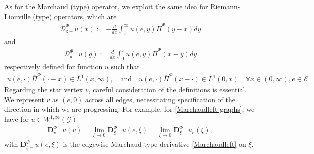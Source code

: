 \documentclass[11pt,a4paper]{article}
\theoremstyle{plain}
\theoremstyle{definition}
\theoremstyle{remark}
\begin{document}
		As for the Marchaud (type) operator, we exploit the same idea for Riemann-Liouville (type) operators, which are
		\begin{align}
			\label{R-LxinfG}
			\mathcal{D}_{\mathsf{x}-}^\Phi u(x):=-\frac{d}{dx} \int_x^\infty u(e,y) \overline{\Pi}^\Phi(y-x) dy
		\end{align}
		and
		\begin{align}
			\label{R-L0xG}
			\mathcal{D}_{\mathsf{x}+}^\Phi u(g):=\frac{d}{dx} \int_0^x u(e,y) \overline{\Pi}^\Phi(x-y) dy
		\end{align}
		respectively defined for function $u$ such that 
		\begin{align*}
			u(e,\cdot) \overline{\Pi}^\Phi(\cdot-x) \in L^1(x,\infty), \quad \text{and} \quad u(e,\cdot) \overline{\Pi}^\Phi(x-\cdot) \in L^1(0,x) \quad \forall x \in (0,\infty), e \in \mathcal{E}.
		\end{align*}
		Regarding the star vertex $v$, careful consideration of the definitions is essential. We represent $v$ as $(e,0)$ across all edges, necessitating specification of the direction in which we are progressing. For example, for \eqref{Marchaudleft-graphs}, we have for $u \in W^{1,\infty}(\mathcal{G})$
		\begin{align}
			\label{marchaud-vertex}
			\mathbf{D}^\Phi_{v-} u(v) = \lim_{\xi \to 0} \mathbf{D}^\Phi_{\xi-} u(e,\xi)= \lim_{\xi \to 0} \mathbf{D}^\Phi_{\xi-} u_e(\xi),
		\end{align}
		with  $\mathbf{D}^\Phi_{\xi-} u(e,\xi)$ is the edgewise Marchaud-type derivative \eqref{Marchaudleft} on $\xi$.
\end{document}
